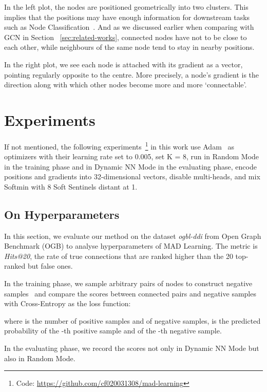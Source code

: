 \documentclass{article}
\begin{document}
In the left plot, the nodes are positioned geometrically into two clusters.
This implies that the positions may have enough information for downstream tasks
such as Node Classification~\cite{1403.6652v2}. And as we discussed
earlier when comparing with GCN in Section ~\ref{sec:related-works}, connected
nodes have not to be close to each other, while neighbours of the same
node tend to stay in nearby positions.

In the right plot, we see each node is attached with its gradient as a
vector, pointing regularly opposite to the centre. More precisely, a
node's gradient is the direction along with which other nodes become
more and more `connectable'.

\hypertarget{experiments}{\section{Experiments}\label{sec:experiments}}

If not mentioned, the following experiments~\footnote{
    Code: \url{https://github.com/cf020031308/mad-learning}
} in this work use Adam~\cite{1412.6980v9}
as optimizers with their learning rate set to 0.005, set K = 8, run in Random Mode
in the training phase and in Dynamic NN Mode in the evaluating phase, encode positions
and gradients into 32-dimensional vectors, disable multi-heads, and mix Softmin with
8 Soft Sentinels distant at 1.

\hypertarget{on-hyperparameters}{\subsection{On Hyperparameters}\label{ssec:on-hyperparameters}}

In this section, we evaluate our method on the dataset \emph{ogbl-ddi}
from Open Graph Benchmark (OGB) to analyse hyperparameters
of MAD Learning. The metric is \emph{Hits@20}, the rate of true connections
that are ranked higher than the 20 top-ranked but false ones.

In the training phase, we sample arbitrary pairs of nodes to construct
negative samples~\cite{1607.00653v1} and compare the scores between
connected pairs and negative samples with Cross-Entropy as the loss function:

where  is the number of positive samples and  of negative samples,
 is the predicted probability of the -th positive sample and  
of the -th negative sample.

In the evaluating phase, we record the scores not only in Dynamic NN Mode but also
in Random Mode.
\end{document}
